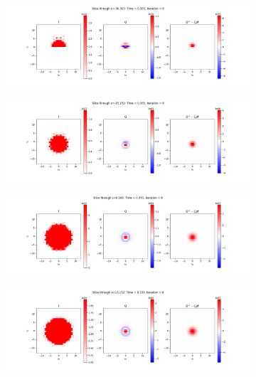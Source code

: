 \documentclass{article}
\begin{document}
\begin{figure}[H]
  \begin{subfigure}[b]{\textwidth}
    \includegraphics[width=\textwidth]{imgs/lf_output2/slice0/mat8.png}
  \end{subfigure}
  \hfill
  \begin{subfigure}[b]{\textwidth}
    \includegraphics[width=\textwidth]{imgs/lf_output2/slice25/mat8.png}
  \end{subfigure}
  \hfill
  \begin{subfigure}[b]{\textwidth}
    \includegraphics[width=\textwidth]{imgs/lf_output2/slice50/mat8.png}
  \end{subfigure}
  \hfill
  \begin{subfigure}[b]{\textwidth}
    \includegraphics[width=\textwidth]{imgs/lf_output2/slice75/mat8.png}
  \end{subfigure}
\end{figure}
\end{document}

